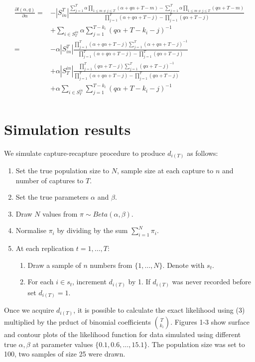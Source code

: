 \documentclass[a4paper, 12pt]{article}
\newcommand{\sint}{|S_{in}^T|}
\begin{document}
\begin{align} \label{eq:7}
    \frac{\partial l(\alpha, q)}{\partial \alpha} =& -\sint \frac{\sum_{j = 1}^{T} \alpha \prod_{1 \leq m \neq j \leq T} (\alpha + q\alpha + T - m) - \sum_{j = 1}^{T} \alpha \prod_{1 \leq m \neq j \leq T} (q\alpha + T - m)}{\prod_{j = 1}^{T} (\alpha + q\alpha + T - j) - \prod_{j=1}^T (q\alpha + T - j)}\nonumber \\
    &+ \sum_{i \in S_T^{in}} \alpha \sum_{j = 1}^{T - k_i} (q\alpha + T - k_i - j)^{-1} \nonumber \\
    =& -\alpha\sint \frac{ \prod_{j = 1}^{T} (\alpha + q\alpha + T - j) \sum_{j = 1}^{T} (\alpha + q\alpha + T - j)^{-1} }{\prod_{j = 1}^{T} (\alpha + q\alpha + T - j) - \prod_{j=1}^T (q\alpha + T - j)} \nonumber \\
    &+ \alpha|S_T^{in}| \frac{\prod_{j = 1}^{T} (q\alpha + T - j) \sum_{j = 1}^{T} (q\alpha + T - j)^{-1}  }{ \prod_{j = 1}^{T} (\alpha + q\alpha + T - j) - \prod_{j=1}^T (q\alpha + T - j)} \nonumber \\
    &+ \alpha \sum_{i \in S_T^{in}} \sum_{j = 1}^{T - k_i} (q\alpha + T - k_i - j)^{-1} \nonumber \\
\end{align}
\section{Simulation results}
We simulate capture-recapture procedure to produce $d_{i(T)}$ as follows:
\begin{enumerate}
    \item Set the true population size to $N$, sample size at each capture to $n$ and number of captures to $T$.
    \item Set the true parameters $\alpha$ and $\beta$.
    \item Draw $N$ values from $\pi \sim Beta(\alpha, \beta)$.
    \item Normalise $\pi_i$ by dividing by the sum $\sum_{i=1}^{N} \pi_i$.
    \item At each replication $t = 1,\dots,T$:
        \begin{enumerate}
            \item Draw a sample of $n$ numbers from $\{1,\dots,N\}$. Denote with $s_t$.
            \item For each $i \in s_t$, increment $d_{i(T)}$ by 1. If $d_{i(T)}$ was never recorded before set $d_{i(T)} = 1$.
        \end{enumerate}
\end{enumerate}
Once we acquire $d_{i(T)}$, it is possible to calculate the exact likelihood using (3) multiplied by the prduct of binomial coefficients $\binom{T}{k_i}$. Figures 1-3 show surface and contour plots of the likelihood function for data simulated using different true $\alpha, \beta$ at parameter values $\{0.1, 0.6, \dots, 15.1\}$. The population size was set to 100, two samples of size 25 were drawn.
\end{document}
